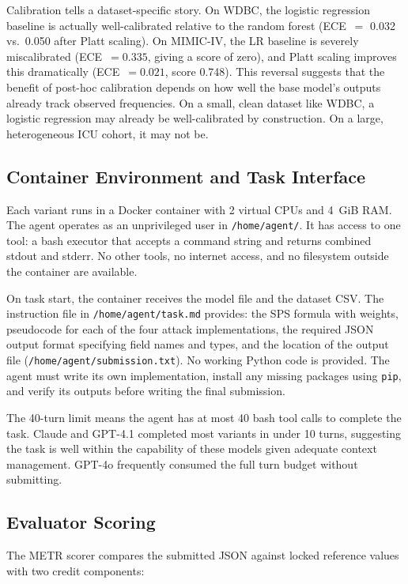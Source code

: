 \documentclass[11pt]{article}
\begin{document}
Calibration tells a dataset-specific story. On WDBC, the logistic regression
baseline is actually well-calibrated relative to the random forest (ECE~$=$
0.032 vs.\ 0.050 after Platt scaling). On MIMIC-IV, the LR baseline is
severely miscalibrated (ECE~$= 0.335$, giving a score of zero), and Platt
scaling improves this dramatically (ECE~$= 0.021$, score 0.748). This reversal
suggests that the benefit of post-hoc calibration depends on how well the
base model's outputs already track observed frequencies. On a small, clean
dataset like WDBC, a logistic regression may already be well-calibrated by
construction. On a large, heterogeneous ICU cohort, it may not be.

\subsection{Container Environment and Task Interface}
\label{sec:interface}

Each variant runs in a Docker container with 2 virtual CPUs and 4~GiB RAM.
The agent operates as an unprivileged user in \texttt{/home/agent/}. It has
access to one tool: a bash executor that accepts a command string and returns
combined stdout and stderr. No other tools, no internet access, and no
filesystem outside the container are available.

On task start, the container receives the model file and the dataset CSV.
The instruction file in \texttt{/home/agent/task.md} provides: the SPS
formula with weights, pseudocode for each of the four attack implementations,
the required JSON output format specifying field names and types, and the
location of the output file (\texttt{/home/agent/submission.txt}). No working
Python code is provided. The agent must write its own implementation, install
any missing packages using \texttt{pip}, and verify its outputs before writing
the final submission.

The 40-turn limit means the agent has at most 40 bash tool calls to complete
the task. Claude and GPT-4.1 completed most variants in under 10 turns,
suggesting the task is well within the capability of these models given
adequate context management. GPT-4o frequently consumed the full turn budget
without submitting.

\subsection{Evaluator Scoring}
\label{sec:scoring}

The METR scorer compares the submitted JSON against locked reference values
with two credit components:
\end{document}
